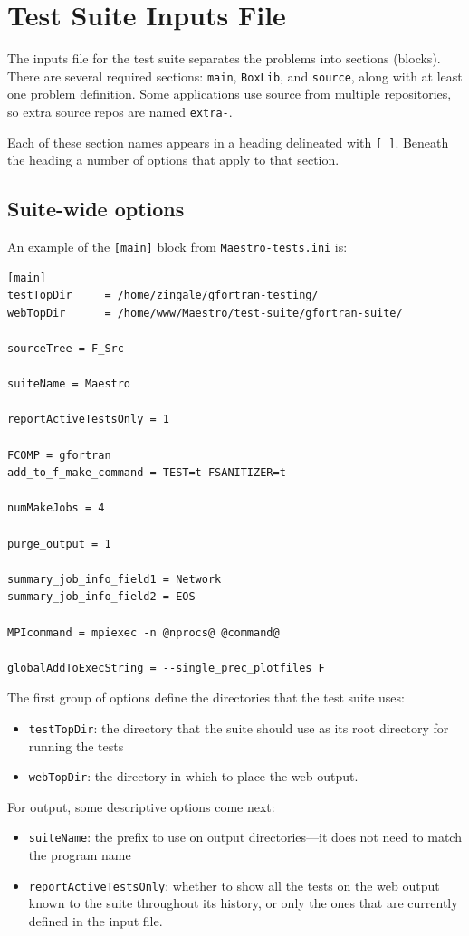 \section{Test Suite Inputs File}

The inputs file for the test suite separates the problems into
sections (blocks).  There are several required sections: {\tt main},
{\tt BoxLib}, and {\tt source}, along with at least one problem
definition.  Some applications use source from multiple repositories,
so extra source repos are named {\tt extra-}{}.

Each of these section names appears in a heading delineated with {\tt [ ]}.
Beneath the heading a number of options that apply to that section.

\subsection{Suite-wide options}

An example of the {\tt [main]} block from {\tt Maestro-tests.ini} is:
\begin{lstlisting}
[main]
testTopDir     = /home/zingale/gfortran-testing/
webTopDir      = /home/www/Maestro/test-suite/gfortran-suite/

sourceTree = F_Src

suiteName = Maestro

reportActiveTestsOnly = 1

FCOMP = gfortran
add_to_f_make_command = TEST=t FSANITIZER=t

numMakeJobs = 4

purge_output = 1

summary_job_info_field1 = Network
summary_job_info_field2 = EOS

MPIcommand = mpiexec -n @nprocs@ @command@

globalAddToExecString = --single_prec_plotfiles F
\end{lstlisting}

The first group of options define the directories that the test suite
uses:
\begin{itemize}
\item {\tt testTopDir}: the directory that the suite should use as its
  root directory for running the tests
\item {\tt webTopDir}: the directory in which to place the web output.
\end{itemize}

For output, some descriptive options come next:
\begin{itemize}
\item {\tt suiteName}: the prefix to use on output directories---it
  does not need to match the program name
\item {\tt reportActiveTestsOnly}: whether to show all the tests on
  the web output known  to the suite throughout its history, or
  only the ones that are currently defined in the input file.
\end{itemize}

